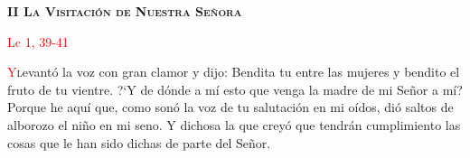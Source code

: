 \begin{center}
    \textbf{\textsc{II La Visitación de Nuestra Señora}}

    \textcolor{red}{Lc 1, 39-41}
\end{center}

\lettrine[lines=2]{\textcolor{red}{Y}} levantó la voz con gran clamor y dijo: Bendita tu entre 
las mujeres y bendito el fruto de tu vientre. {?`}Y de dónde a mí esto que venga la madre de mi Señor a mí? Porque he aquí que, 
como sonó la voz de tu salutación en mi oídos, dió saltos de alborozo el niño en mi seno. Y dichosa la que creyó que tendrán
cumplimiento las cosas que le han sido dichas de parte del Señor.